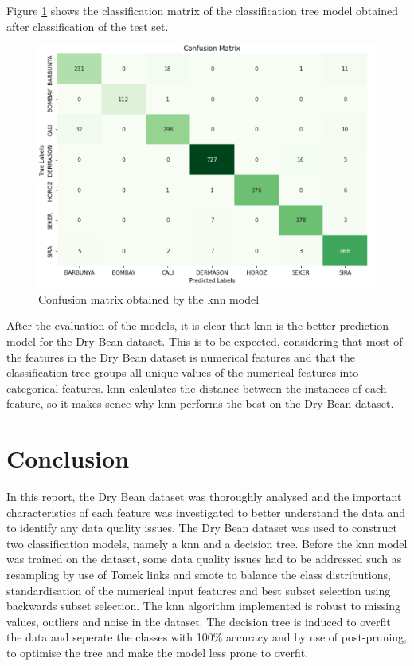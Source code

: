 \documentclass[10pt, conference]{IEEEtran}
\begin{document}
Figure \ref{CT confusion matrix} shows the classification matrix of the classification tree model
obtained after classification of the test set.
\begin{figure}[H]
    \centerline{\includegraphics[scale=0.5]{../Plots/Classification tree confusion matrix.png}}
    \caption{Confusion matrix obtained by the \acrshort{knn} model}
    \label{CT confusion matrix}
\end{figure}

After the evaluation of the models, it is clear that \acrshort{knn} is the better prediction model for the
Dry Bean dataset. This is to be expected, considering that most of the features in the Dry Bean dataset is
numerical features and that the classification tree groups all unique values of the numerical features into
categorical features. \acrshort{knn} calculates the distance between the instances of each feature, so it makes sence
why \acrshort{knn} performs the best on the Dry Bean dataset.

\section{Conclusion} \label{section:Conclusion}

In this report, the Dry Bean dataset was thoroughly analysed and the important characteristics of each feature was investigated
to better understand the data and to identify any data quality issues. The Dry Bean dataset was used to construct two classification
models, namely a \acrfull{knn} and a decision tree. Before the \acrshort{knn} model was trained on the dataset, some data
quality issues had to be addressed such as resampling by use of Tomek links and \acrfull{smote} to balance the class distributions,
standardisation of the numerical input features and best subset selection using backwards subset selection. The \acrshort{knn}
algorithm implemented is robust to missing values, outliers and noise in the dataset. The decision tree is induced to overfit the data
and seperate the classes with 100\% accuracy and by use of post-pruning, to optimise the tree and make the model less prone to overfit.
\end{document}
